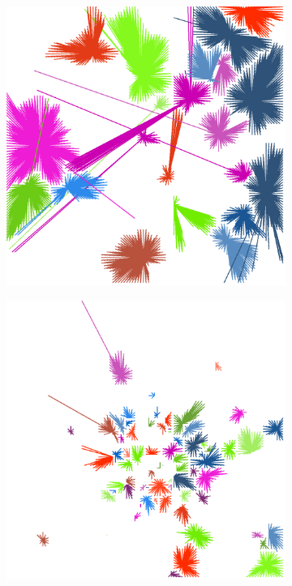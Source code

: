 \documentclass[12pt,a4paper]{article}
\begin{document}
\begin{figure}[H]
\begin{subfigure}[b]{0.3\textwidth}
\caption{}
\end{subfigure}
\begin{subfigure}[b]{0.3\textwidth}
\includegraphics[width=\textwidth]{weekDef/edges-1Mon-mid.png}
\caption{}
\end{subfigure}
\begin{subfigure}[b]{0.3\textwidth}
\includegraphics[width=\textwidth]{weekDef/edges-1Mon-small.png}
\caption{}
\end{subfigure}


\end{figure}
\end{document}
